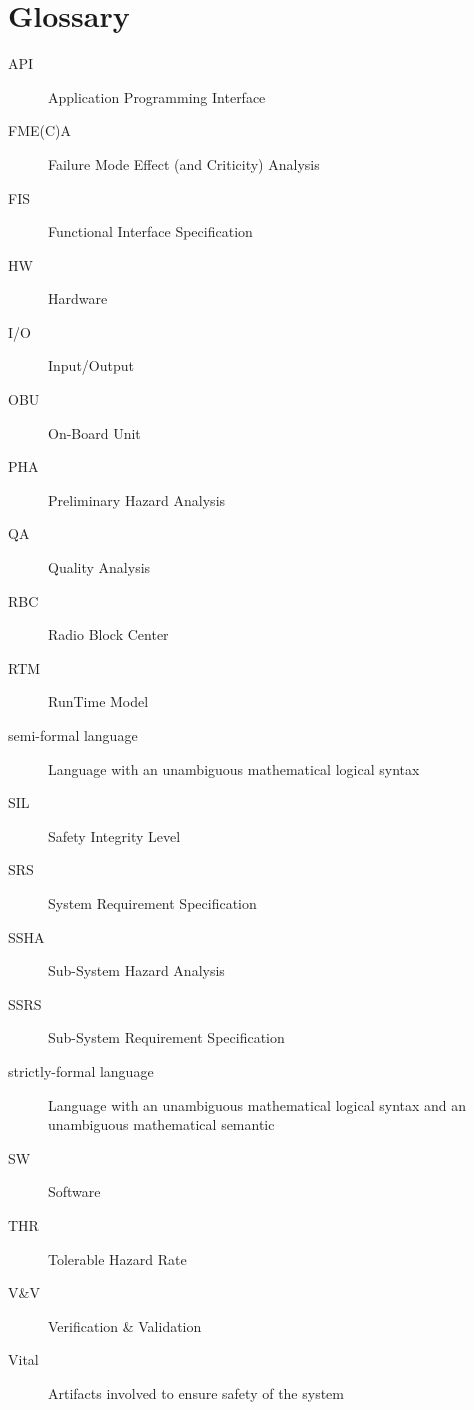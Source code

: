 
\section{Glossary}
\begin{description}
\item[API] Application Programming Interface
\item[FME(C)A] Failure Mode Effect (and Criticity) Analysis
\item[FIS] Functional Interface Specification
\item[HW] Hardware
\item[I/O] Input/Output
\item[OBU] On-Board Unit
\item[PHA] Preliminary Hazard Analysis
\item[QA] Quality Analysis
\item[RBC] Radio Block Center
\item[RTM] RunTime Model
\item[semi-formal language] Language with an unambiguous mathematical logical syntax
\item[SIL] Safety Integrity Level
\item[SRS] System Requirement Specification
\item[SSHA] Sub-System Hazard Analysis
\item[SSRS] Sub-System Requirement Specification
\item[strictly-formal language] Language with an unambiguous mathematical logical syntax and an unambiguous mathematical semantic
\item[SW] Software
\item[THR] Tolerable Hazard Rate
\item[V\&V] Verification \& Validation
\item[Vital]	Artifacts involved to ensure safety of the system
\end{description}

